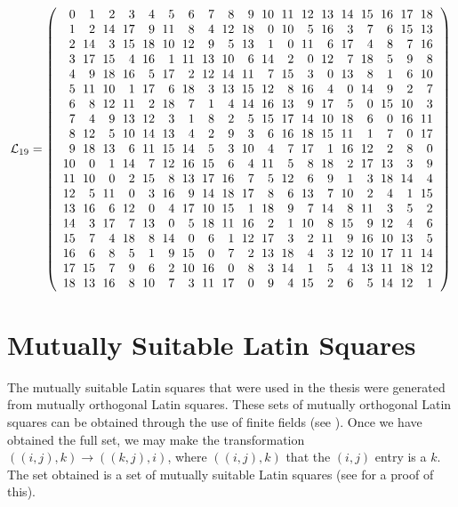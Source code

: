 $$\mathcal{L}_{19}=
\left(\begin{array}{r@{\hskip6pt}r@{\hskip6pt}r@{\hskip6pt}r@{\hskip6pt}r@{\hskip6pt}r@{\hskip6pt}r@{\hskip6pt}r@{\hskip6pt}r@{\hskip6pt}r@{\hskip6pt}r@{\hskip6pt}r@{\hskip6pt}r@{\hskip6pt}r@{\hskip6pt}r@{\hskip6pt}r@{\hskip6pt}r@{\hskip6pt}r@{\hskip6pt}r@{\hskip6pt}r}
0&1&2&3&4&5&6&7&8&9&10&11&12&13&14&15&16&17&18\\
1&2&14&17&9&11&8&4&12&18&0&10&5&16&3&7&6&15&13\\
2&14&3&15&18&10&12&9&5&13&1&0&11&6&17&4&8&7&16\\
3&17&15&4&16&1&11&13&10&6&14&2&0&12&7&18&5&9&8\\
4&9&18&16&5&17&2&12&14&11&7&15&3&0&13&8&1&6&10\\
5&11&10&1&17&6&18&3&13&15&12&8&16&4&0&14&9&2&7\\
6&8&12&11&2&18&7&1&4&14&16&13&9&17&5&0&15&10&3\\
7&4&9&13&12&3&1&8&2&5&15&17&14&10&18&6&0&16&11\\
8&12&5&10&14&13&4&2&9&3&6&16&18&15&11&1&7&0&17\\
9&18&13&6&11&15&14&5&3&10&4&7&17&1&16&12&2&8&0\\
10&0&1&14&7&12&16&15&6&4&11&5&8&18&2&17&13&3&9\\
11&10&0&2&15&8&13&17&16&7&5&12&6&9&1&3&18&14&4\\
12&5&11&0&3&16&9&14&18&17&8&6&13&7&10&2&4&1&15\\
13&16&6&12&0&4&17&10&15&1&18&9&7&14&8&11&3&5&2\\
14&3&17&7&13&0&5&18&11&16&2&1&10&8&15&9&12&4&6\\
15&7&4&18&8&14&0&6&1&12&17&3&2&11&9&16&10&13&5\\
16&6&8&5&1&9&15&0&7&2&13&18&4&3&12&10&17&11&14\\
17&15&7&9&6&2&10&16&0&8&3&14&1&5&4&13&11&18&12\\
18&13&16&8&10&7&3&11&17&0&9&4&15&2&6&5&14&12&1
\end{array}\right)$$

\section[Mutually Suitable Latin Squares]{Mutually Suitable Latin Squares}
\label{sec:msls}

The mutually suitable Latin squares that were used in the thesis were generated from mutually orthogonal Latin squares. These sets of mutually orthogonal Latin squares can be obtained through the use of finite fields (see \cite[Construction 3.29]{hcd}). Once we have obtained the full set, we may make the transformation $((i,j),k) \longrightarrow ((k,j),i)$, where $((i,j),k)$ that the $(i,j)$ entry is a $k$. The set obtained is a set of mutually suitable Latin squares (see \cite[Lemma 9]{real-muh} for a proof of this).
